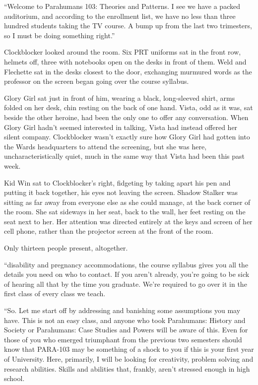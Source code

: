 





``Welcome to Parahumans 103: Theories and Patterns.  I see we have a packed auditorium, and according to the enrollment list, we have no less than three hundred students taking the TV course.  A bump up from the last two trimesters, so I must be doing something right.''



Clockblocker looked around the room.  Six PRT uniforms sat in the front row, helmets off, three with notebooks open on the desks in front of them.  Weld and Flechette sat in the desks closest to the door, exchanging murmured words as the professor on the screen began going over the course syllabus.



Glory Girl sat just in front of him, wearing a black, long-sleeved shirt, arms folded on her desk, chin resting on the back of one hand.  Vista, odd as it was, sat beside the other heroine, had been the only one to offer any conversation.  When Glory Girl hadn't seemed interested in talking, Vista had instead offered her silent company.  Clockblocker wasn't exactly sure how Glory Girl had gotten into the Wards headquarters to attend the screening, but she was here, uncharacteristically quiet, much in the same way that Vista had been this past week.



Kid Win sat to Clockblocker's right, fidgeting by taking apart his pen and putting it back together, his eyes not leaving the screen.  Shadow Stalker was sitting as far away from everyone else as she could manage, at the back corner of the room.  She sat sideways in her seat, back to the wall, her feet resting on the seat next to her.  Her attention was directed entirely at the keys and screen of her cell phone, rather than the projector screen at the front of the room.



Only thirteen people present, altogether.



``\ldotsfor disability and pregnancy accommodations, the course syllabus gives you all the details you need on who to contact.  If you aren't already, you're going to be sick of hearing all that by the time you graduate.  We're required to go over it in the first class of every class we teach.



``So.  Let me start off by addressing and banishing some assumptions you may have.  This is not an easy class, and anyone who took Parahumans: History and Society or Parahumans: Case Studies and Powers will be aware of this.  Even for those of you who emerged triumphant from the previous two semesters should know that PARA-103 may be something of a shock to you if this is your first year of University.  Here, primarily, I will be looking for creativity, problem solving and research abilities.  Skills and abilities that, frankly, aren't stressed enough in high school.



